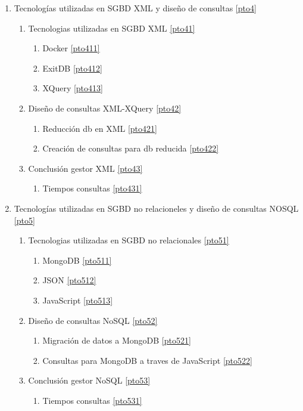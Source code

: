 \documentclass[12pt,a4paper]{article}
\begin{document}
\begin{enumerate}
	 
\item Tecnologías utilizadas en SGBD XML y diseño de consultas \ref{pto4}
	\begin{enumerate}[label*=\arabic*.]
	\item Tecnologias utilizadas en SGBD XML \ref{pto41}
		\begin{enumerate}[label*=\arabic*.]
		\item Docker \ref{pto411}
		\item ExitDB \ref{pto412}
		\item XQuery \ref{pto413}
		\end{enumerate}
	
	\item Diseño de consultas XML-XQuery \ref{pto42}
		\begin{enumerate}[label*=\arabic*.]
		\item Reducción db en XML \ref{pto421}
		\item Creación de consultas para db reducida \ref{pto422}
		\end{enumerate}

	\item Conclusión gestor XML \ref{pto43}
		\begin{enumerate}[label*=\arabic*.]
		\item Tiempos consultas \ref{pto431}
		\end{enumerate}
	\end{enumerate}
	
\item  Tecnologías utilizadas en SGBD no relacioneles y diseño de consultas NOSQL \ref{pto5}
	\begin{enumerate}[label*=\arabic*.]
	\item Tecnologias utilizadas en SGBD no relacionales \ref{pto51}
		\begin{enumerate}[label*=\arabic*.]
		\item MongoDB \ref{pto511}
		\item JSON \ref{pto512}
		\item JavaScript \ref{pto513}
		\end{enumerate}
	\item Diseño de consultas NoSQL \ref{pto52}
		\begin{enumerate}[label*=\arabic*.]
		\item Migración de datos a MongoDB \ref{pto521}
		\item Consultas para MongoDB a traves de JavaScript \ref{pto522}
		\end{enumerate}
	\item Conclusión gestor NoSQL \ref{pto53}
		\begin{enumerate}[label*=\arabic*.]
		\item Tiempos consultas \ref{pto531}
		\end{enumerate}
	\end{enumerate}



\end{enumerate}
\end{document}
